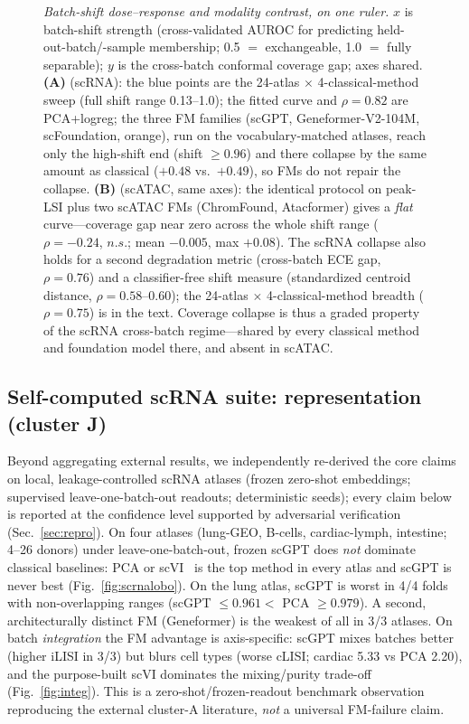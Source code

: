 \documentclass[11pt]{article}
\begin{document}
\begin{figure}[htb]\centering
\caption{\emph{Batch-shift dose--response and modality contrast, on one ruler.} $x$ is batch-shift strength (cross-validated AUROC for predicting held-out-batch/-sample membership; 0.5 $=$ exchangeable, 1.0 $=$ fully separable); $y$ is the cross-batch conformal coverage gap; axes shared. \textbf{(A)} (scRNA): the blue points are the 24-atlas $\times$ 4-classical-method sweep (full shift range 0.13--1.0); the fitted curve and $\rho=0.82$ are PCA+logreg; the three FM families (scGPT, Geneformer-V2-104M, scFoundation, orange), run on the vocabulary-matched atlases, reach only the high-shift end (shift $\ge 0.96$) and there collapse by the same amount as classical ($+0.48$ vs.\ $+0.49$), so FMs do not repair the collapse. \textbf{(B)} (scATAC, same axes): the identical protocol on peak-LSI plus two scATAC FMs (ChromFound, Atacformer) gives a \emph{flat} curve---coverage gap near zero across the whole shift range ($\rho=-0.24$, $n.s.$; mean $-0.005$, max $+0.08$). The scRNA collapse also holds for a second degradation metric (cross-batch ECE gap, $\rho=0.76$) and a classifier-free shift measure (standardized centroid distance, $\rho=0.58$--$0.60$); the 24-atlas $\times$ 4-classical-method breadth ($\rho=0.75$) is in the text. Coverage collapse is thus a graded property of the scRNA cross-batch regime---shared by every classical method and foundation model there, and absent in scATAC.}\label{fig:batchdose}\end{figure}

\FloatBarrier
\subsection{Self-computed scRNA suite: representation (cluster J)}
Beyond aggregating external results, we independently re-derived the core claims on local, leakage-controlled scRNA atlases (frozen zero-shot embeddings; supervised leave-one-batch-out readouts; deterministic seeds); every claim below is reported at the confidence level supported by adversarial verification (Sec.~\ref{sec:repro}).
On four atlases (lung-GEO, B-cells, cardiac-lymph, intestine; 4--26 donors) under leave-one-batch-out, frozen scGPT does \emph{not} dominate classical baselines: PCA or scVI~\cite{lopez2018} is the top method in every atlas and scGPT is never best (Fig.~\ref{fig:scrnalobo}). On the lung atlas, scGPT is worst in 4/4 folds with non-overlapping ranges (scGPT $\le 0.961 < $ PCA $\ge 0.979$). A second, architecturally distinct FM (Geneformer) is the weakest of all in 3/3 atlases. On batch \emph{integration} the FM advantage is axis-specific: scGPT mixes batches better (higher iLISI in 3/3) but blurs cell types (worse cLISI; cardiac 5.33 vs PCA 2.20), and the purpose-built scVI dominates the mixing/purity trade-off (Fig.~\ref{fig:integ}). This is a zero-shot/frozen-readout benchmark observation reproducing the external cluster-A literature, \emph{not} a universal FM-failure claim.
\end{document}
